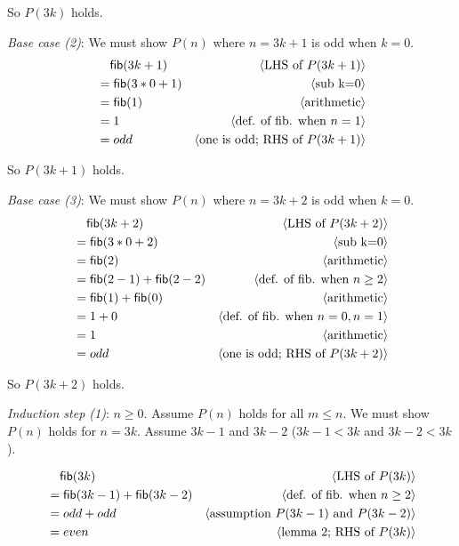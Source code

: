 \documentclass[11pt,fleqn]{article}
\newcommand{\mname}[1]{\mbox{\sf #1}}
\newcommand{\pnote}[1]{{\langle \text{#1} \rangle}}
\begin{document}
\begin{enumerate}
  So $P(3k)$ holds.

  \emph{Base case (2)}: We must show $P(n)$ where $n=3k+1$ is odd when $k=0$.
  \begin{align*}
    &\phantom{{}=} \mname{fib}(3k+1) & \pnote{LHS of $P(3k+1)$}\\
    &= \mname{fib}(3*0+1)  & \pnote{sub k=0}\\
    &= \mname{fib}(1) & \pnote{arithmetic}\\
    &= 1 & \pnote{def. of fib. when $n=1$}\\
    &= odd    & \pnote{one is odd; RHS of $P(3k+1)$}\\
  \end{align*}

  So $P(3k+1)$ holds.

  \emph{Base case (3)}: We must show $P(n)$ where $n=3k+2$ is odd when $k=0$.
  \begin{align*}
    &\phantom{{}=} \mname{fib}(3k+2) & \pnote{LHS of $P(3k+2)$}\\
    &= \mname{fib}(3*0+2)  & \pnote{sub k=0}\\
    &= \mname{fib}(2) & \pnote{arithmetic}\\
    &= \mname{fib}(2-1)+\mname{fib}(2-2) & \pnote{def. of fib. when $n \ge 2$}\\
    &= \mname{fib}(1)+\mname{fib}(0) & \pnote{arithmetic}\\
    &= 1+0 & \pnote{def. of fib. when $n=0, n=1$}\\
    &= 1 & \pnote{arithmetic}\\
    &= odd    & \pnote{one is odd; RHS of $P(3k+2)$}\\
  \end{align*}

  So $P(3k+2)$ holds.

  \medskip

  \emph{Induction step (1)}: $n \ge 0$. Assume $P(n)$ holds for all $m \le n$. We must show $P(n)$ holds for $n=3k$. Assume $3k-1$ and $3k-2$ ($3k-1 < 3k$ and $3k-2 < 3k$).

  \begin{align*}
    &\phantom{{}=} \mname{fib}(3k) & \pnote{LHS of $P(3k)$}\\
    &= \mname{fib}(3k-1)+\mname{fib}(3k-2) & \pnote{def. of fib. when $n \ge 2$}\\
    &= odd + odd   & \pnote{assumption $P(3k-1)$ and $P(3k-2)$}\\
    &= even & \pnote{lemma 2; RHS of $P(3k)$}\\
  \end{align*}


\end{enumerate}
\end{document}
